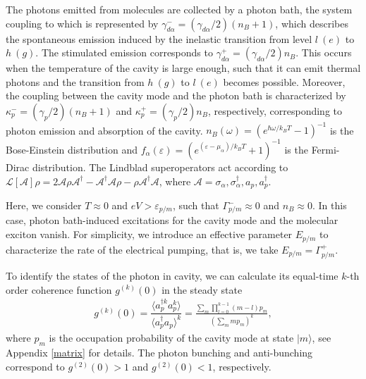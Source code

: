 \documentclass[aps,preprint,floatfix,footinbib,longbibliography]{revtex4-1}
\begin{document}
{The photons emitted from molecules are collected by a photon bath, the system coupling to which is represented by $\gamma_{d\alpha}^{-}=(\gamma_{d\alpha}/2)(n_{B}+1)$, which describes the spontaneous emission induced by the inelastic transition from level $l~(e)$ to $h~(g)$. The stimulated emission corresponds to $\gamma_{d\alpha}^{+}=(\gamma_{d\alpha}/2)n_{B}$. This occurs when the temperature of the cavity is large enough, such that it can emit thermal photons and the transition from $h~(g)$ to $l~(e)$ becomes possible.
%
Moreover, the coupling between the cavity mode and the photon bath is characterized by $\kappa_{p}^{-}=(\gamma_{p}/2)(n_{B}+1)$ and $\kappa_{p}^{+}=(\gamma_{p}/2)n_{B}$, respectively, corresponding to photon emission and absorption of the cavity.
%
$n_{B}(\omega)=(e^{\hbar\omega/k_{B}T}-1)^{-1}$ is the Bose-Einstein distribution and $f_{\alpha}(\varepsilon)=(e^{(\varepsilon-\mu_{\alpha})/k_{B}T}+1)^{-1}$ is the  Fermi-Dirac distribution.
The Lindblad superoperators act according to $\mathcal{L}[\mathcal{A}]\rho=2\mathcal{A}\rho \mathcal{A}^{\dagger}-\mathcal{A}^{\dagger}\mathcal{A}\rho-\rho\mathcal{A}^{\dagger}\mathcal{A}$, where $\mathcal{A}=\sigma_{\alpha},\sigma_{\alpha}^{\dagger},a_{p},a_{p}^{\dagger}$.

Here, we consider $T\approx0$ and $eV>\varepsilon_{p/m}$, such that $\Gamma^{-}_{p/m}\approx 0$ and $n_{B}\approx0$. In this case, photon bath-induced excitations for the cavity mode and the molecular exciton vanish.
For simplicity, we introduce an effective parameter $E_{p/m}$ to characterize the rate of the electrical pumping, that is, we take $E_{p/m}=\Gamma^{+}_{p/m}$.}

To identify the states of the photon in cavity, we can calculate its equal-time $k$-th order coherence function $g^{(k)}(0)$ in the steady state
\begin{equation}
\begin{split}
g^{(k)}(0)=\dfrac{\langle a_{p}^{\dagger k} a_{p}^{k} \rangle}{\langle a_{p}^{\dagger} a_{p} \rangle^{k}}=\frac{\sum_{m}\prod_{l=0}^{k-1}(m-l)p_{m}}{(\sum_{m}mp_{m})^{k}},
\end{split}
\label{gn}
\end{equation}
where $p_{m}$ is the occupation probability of the cavity mode at state $|m\rangle$, see Appendix \ref{matrix} for details.
The photon bunching and anti-bunching correspond to $g^{(2)}(0)>1$ and $g^{(2)}(0)<1$, respectively.
\end{document}

